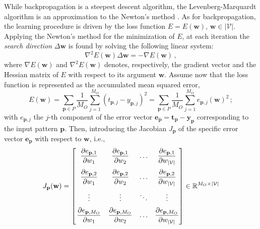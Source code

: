 \documentclass[12pt, a4paper, twoside, openright]{report}
\numberwithin{equation}{chapter}
\theoremstyle{theorem}
\theoremstyle{definition}
\theoremstyle{remark}
\theoremstyle{proposition}
\numberwithin{figure}{chapter}
\begin{document}
		While backpropagation is a steepest descent algorithm, the Levenberg-Marquardt algorithm \cite{Mar63} is an approximation to the Newton's method \cite{Hag94}. As for backpropagation, the learning procedure is driven by the loss function $E = E(\mathbf{w})$, $\mathbf{w} \in |\mathcal{V}|$. Applying the Newton's method for the minimization of $E$, at each iteration the \emph{search direction} $\Delta \mathbf{w}$ is found by solving the following linear system:
		\begin{equation}
			\label{eq:newton}
			\nabla^2 E(\mathbf{w}) \Delta \mathbf{w} = - \nabla E(\mathbf{w}) \, ,
		\end{equation}
		where $\nabla E(\mathbf{w})$ and $\nabla^2 E(\mathbf{w})$ denotes, respectively, the gradient vector and the Hessian matrix of $E$ with respect to its argument $\mathbf{w}$. Assume now that the loss function is represented as the accumulated mean squared error, 
		\begin{equation}
			\label{eq:accumulated-mse-bis}
			E(\mathbf{w}) = \sum_{\mathbf{p} \in P} \dfrac{1}{M_O} \sum_{j = 1}^{M_O} \left( t_{\mathbf{p},j} - y_{\mathbf{p},j} \right)^2 = \sum_{\mathbf{p} \in P} \dfrac{1}{M_O} \sum_{j = 1}^{M_O} e_{\mathbf{p},j}(\mathbf{w})^2 \, ;
		\end{equation}
		with $e_{\mathbf{p},j}$ the $j$-th component of the error vector $\mathbf{e}_{\mathbf{p}} = \mathbf{t}_{\mathbf{p}} - \mathbf{y}_{\mathbf{p}}$ corresponding to the input pattern $\mathbf{p}$. Then, introducing the Jacobian $J_{\mathbf{p}}$ of the specific error vector $\mathbf{e}_{\mathbf{p}}$ with respect to $\mathbf{w}$, i.e., 
		\begin{equation}
			\label{eq:jacobian}
			J_{\mathbf{p}}(\mathbf{w}) = 
			\begin{bmatrix}
				\vspace*{0.2cm}
				\hspace*{-0.3cm} & \dfrac{\partial e_{\mathbf{p},1}}{\partial w_1} & \dfrac{\partial e_{\mathbf{p},1}}{\partial w_2} & \ldots & \dfrac{\partial e_{\mathbf{p},1}}{\partial w_{|\mathcal{V}|}} \\
				\vspace*{0.2cm}
				\hspace*{-0.3cm} & \dfrac{\partial e_{\mathbf{p},2}}{\partial w_1} & \dfrac{\partial e_{\mathbf{p},2}}{\partial w_2} & \ldots & \dfrac{\partial e_{\mathbf{p},2}}{\partial w_{|\mathcal{V}|}} \\
				\vspace*{0.2cm}
				\hspace*{-0.3cm} & \vdots & \vdots & \ddots & \vdots \\
				\hspace*{-0.3cm} & \dfrac{\partial e_{\mathbf{p},M_O}}{\partial w_1} & \dfrac{\partial e_{\mathbf{p},M_O}}{\partial w_2} & \ldots & \dfrac{\partial e_{\mathbf{p},M_O}}{\partial w_{|\mathcal{V}|}}
			\end{bmatrix}
			\in \mathbb{R}^{M_O \times |\mathcal{V}|}
		\end{equation}
\end{document}
